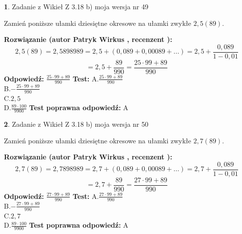 \documentclass[12pt, a4paper]{article}
\theoremstyle{definition} %
\newtheorem{zad}{}
\newcommand{\zadStart}[1]{\begin{zad}#1\newline}
\newcommand{\zadStop}{\end{zad}}
\newcommand{\rozwStart}[2]{\noindent \textbf{Rozwiązanie (autor #1 , recenzent #2): }\newline}
\newcommand{\rozwStop}{\newline}
\newcommand{\odpStart}{\noindent \textbf{Odpowiedź:}\newline}
\newcommand{\odpStop}{\newline}
\newcommand{\testStart}{\noindent \textbf{Test:}\newline}
\newcommand{\testStop}{\newline}
\newcommand{\kluczStart}{\noindent \textbf{Test poprawna odpowiedź:}\newline}
\newcommand{\kluczStop}{\newline}
\begin{document}
\zadStart{Zadanie z Wikieł Z 3.18 b) moja wersja nr 49}

Zamień poniższe ułamki dziesiętne okresowe na ułamki zwykłe $2,5(89)$.
\zadStop
\rozwStart{Patryk Wirkus}{}
$$2,5(89)=2,5898989=2,5+(0,089+0,00089+...)=2,5+\frac{0,089}{1-0,01}$$
$$=2,5+\frac{89}{990}=\frac{25\cdot99+89}{990}$$
\rozwStop
\odpStart
$\frac{25\cdot99+89}{990}$
\odpStop
\testStart
A.$\frac{25\cdot99+89}{990}$\\ B.$-\frac{25\cdot99+89}{990}$\\ C.$2,5$\\ D.$\frac{89\cdot100}{9900}$
\testStop
\kluczStart
A
\kluczStop



\zadStart{Zadanie z Wikieł Z 3.18 b) moja wersja nr 50}

Zamień poniższe ułamki dziesiętne okresowe na ułamki zwykłe $2,7(89)$.
\zadStop
\rozwStart{Patryk Wirkus}{}
$$2,7(89)=2,7898989=2,7+(0,089+0,00089+...)=2,7+\frac{0,089}{1-0,01}$$
$$=2,7+\frac{89}{990}=\frac{27\cdot99+89}{990}$$
\rozwStop
\odpStart
$\frac{27\cdot99+89}{990}$
\odpStop
\testStart
A.$\frac{27\cdot99+89}{990}$\\ B.$-\frac{27\cdot99+89}{990}$\\ C.$2,7$\\ D.$\frac{89\cdot100}{9900}$
\testStop
\kluczStart
A
\kluczStop
\end{document}
